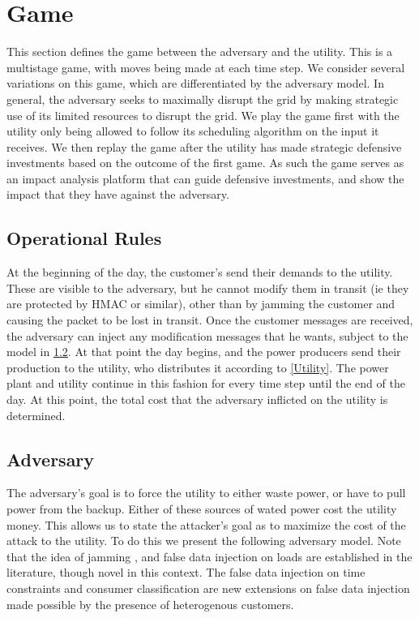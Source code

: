 \documentclass[conference]{IEEEtran}
\begin{document}
\section{Game}
\label{Game}

This section defines the game between the adversary and the utility.  This is a multistage game, with moves being made at each time step.  We consider several variations on this game, which are differentiated by the adversary model.  In general, the adversary seeks to maximally disrupt the grid by making strategic use of its limited resources to disrupt the grid.  We play the game first with the utility only being allowed to follow its scheduling algorithm on the input it receives.  We then replay the game after the utility has made strategic defensive investments based on the outcome of the first game.  As such the game serves as an impact analysis platform that can guide defensive investments, and show the impact that they have against the adversary.   

\subsection{Operational Rules}
\label{Rules}

At the beginning of the day, the customer's send their demands to the utility.  These are visible to the adversary, but he cannot modify them in transit (ie they are protected by HMAC or similar), other than by jamming the customer and causing the packet to be lost in transit.    Once the customer messages are received, the adversary can inject any modification messages that he wants, subject to the model in \ref{Adversary}.  At that point the day begins, and the power producers send their production to the utility, who distributes it according to \ref{Utility}.  The power plant and utility continue in this fashion for every time step until the end of the day.  At this point, the total cost that the adversary inflicted
on the utility is determined.

\subsection{Adversary}
\label{Adversary}

The adversary's goal is to force the utility to either waste power, or have to pull power from the backup.  Either of these sources of wated power cost the utility money.  This allows us to state the attacker's goal as to maximize the cost of the attack to the utility.  To do this we present the following adversary model.  Note that the idea of jamming \cite{gupta2010optimal}, and false data injection on loads \cite{lin2012false}\cite{yuan2011modeling} are established in the literature, though novel in this context.  The false data injection on time constraints and consumer classification are new extensions on false data injection made possible by the presence of heterogenous customers.
\end{document}
